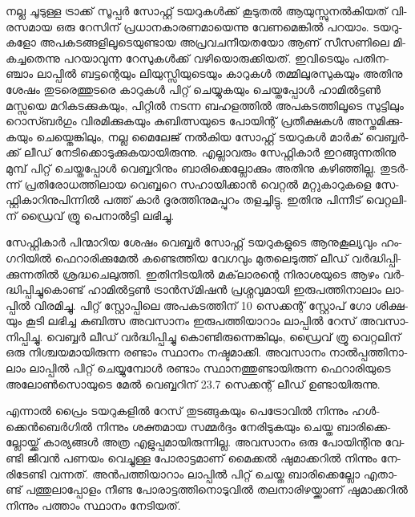 ­ന­ല്ല ചൂ­ടു­ള്ള ട്രാ­ക്ക് സൂ­പ്പര്‍ സോ­ഫ്റ്റ് ടയ­റു­കള്‍­ക്ക് കൂ­ടു­തല്‍ ആയു­സ്സു­നല്‍­കി­യ­ത് വി­ര­സ­മായ ഒരു റേ­സി­ന് 
പ്ര­ധാ­ന­കാ­ര­ണ­മാ­യെ­ന്നു വേ­ണ­മെ­ങ്കില്‍ പറ­യാം. ടയ­റു­ക­ളോ അപ­ക­ട­ങ്ങ­ളി­ലൂ­ടെ­യു­ണ്ടായ അപ്ര­വ­ച­നീ­യ­ത­യോ ആണ് 
സീ­സ­ണി­ലെ മി­ക­ച്ച­തെ­ന്നു പറ­യാ­വു­ന്ന റേ­സു­കള്‍­ക്ക് വഴി­യൊ­രു­ക്കി­യ­ത്. ഇവി­ടെ­യും പതി­ന­ഞ്ചാം ലാ­പ്പില്‍ ബട്ട­ന്റെ­യും 
ലി­യു­സ്സി­യു­ടെ­യും കാ­റു­കള്‍ തമ്മി­ലു­ര­സു­ക­യും അതി­നു ശേ­ഷം തു­ട­രെ­ത്തു­ട­രെ കാ­റു­കള്‍ പി­റ്റ് ചെ­യ്യു­ക­യും ചെ­യ്ത­പ്പോള്‍ 
ഹാ­മില്‍­ട്ടണ്‍ മസ്സ­യെ മറി­ക­ട­ക്കു­ക­യും, പി­റ്റില്‍ നട­ന്ന ബഹ­ള­ത്തില്‍ അപ­ക­ട­ത്തി­ലൂ­ടെ സു­ട്ടി­ലും റൊ­സ്ബര്‍­ഗും 
വി­ര­മി­ക്കു­ക­യും കു­ബി­ത്സ­യു­ടെ പോ­യി­ന്റ് പ്ര­തീ­ക്ഷ­കള്‍ അസ്ത­മി­ക്കു­ക­യും ചെ­യ്തെ­ങ്കി­ലും, നല്ല മൈ­ലേ­ജ് നല്‍­കിയ സോ­ഫ്റ്റ് 
ടയ­റു­കള്‍ മാര്‍­ക് വെ­ബ്ബര്‍­ക്ക് ലീ­ഡ് നേ­ടി­ക്കൊ­ടു­ക്കു­ക­യാ­യി­രു­ന്നു. എല്ലാ­വ­രും സേ­ഫ്റ്റി­കാര്‍ ഇറ­ങ്ങു­ന്ന­തി­നു മു­മ്പ് പി­റ്റ് 
ചെ­യ്ത­പ്പോള്‍ വെ­ബ്ബ­റി­നും ബാ­രി­ക്കെ­ല്ലോ­ക്കും അതി­നു കഴി­ഞ്ഞി­ല്ല. തു­ടര്‍­ന്ന് പ്ര­തി­രോ­ധ­ത്തി­ലായ വെ­ബ്ബ­റെ സഹാ­യി­ക്കാന്‍ 
വെ­റ്റല്‍ മറ്റു­കാ­റു­ക­ളെ സേ­ഫ്റ്റി­കാ­റി­നു­പി­ന്നില്‍ പത്ത് കാര്‍ ദൂ­ര­ത്തി­നു­മ­പ്പു­റം തള­ച്ചി­ട്ടു. ഇതി­നു പി­ന്നീ­ട് വെ­റ്റ­ലി­ന് ഡ്രൈ­വ് 
ത്രൂ പെ­നാല്‍­ട്ടി ലഭി­ച്ചു­.

­സേ­ഫ്റ്റി­കാര്‍ പി­ന്മാ­റിയ ശേ­ഷം വെ­ബ്ബര്‍ സോ­ഫ്റ്റ് ടയ­റു­ക­ളു­ടെ ആനു­കൂ­ല്യ­വും ഹം­ഗ­റി­യില്‍ ഫെ­റാ­രി­ക്കു­മേല്‍ കണ്ടെ­ത്തിയ 
വേ­ഗ­വും മു­ത­ലെ­ടു­ത്ത് ലീ­ഡ് വര്‍­ദ്ധി­പ്പി­ക്കു­ന്ന­തില്‍ ശ്ര­ദ്ധ­ചെ­ലു­ത്തി. ഇതി­നി­ട­യില്‍ മക്‌­ലാ­ര­ന്റെ നി­രാ­ശ­യു­ടെ ആഴം 
വര്‍­ദ്ധി­പ്പി­ച്ചു­കൊ­ണ്ട് ഹാ­മില്‍­ട്ടണ്‍ ട്രാന്‍­സ്‌­മി­ഷന്‍ പ്ര­ശ്ന­വു­മാ­യി ഇരു­പ­ത്തി­നാ­ലാം ലാ­പ്പില്‍ വി­ര­മി­ച്ചു. പി­റ്റ് സ്റ്റോ­പ്പി­ലെ 
അപ­ക­ട­ത്തി­ന് 10 സെ­ക്ക­ന്റ് സ്റ്റോ­പ് ഗോ ശി­ക്ഷ­യും കൂ­ടി ലഭി­ച്ച കു­ബി­ത്സ അവ­സാ­നം ഇരു­പ­ത്തി­യാ­റാം ലാ­പ്പില്‍ 
റേ­സ് അവ­സാ­നി­പ്പി­ച്ചു. വെ­ബ്ബര്‍ ലീ­ഡ് വര്‍­ദ്ധി­പ്പി­ച്ചു കൊ­ണ്ടി­രു­ന്നെ­ങ്കി­ലും, ഡ്രൈ­വ് ത്രൂ വെ­റ്റ­ലി­ന് ഒരു 
നി­ശ്ച­യ­മാ­യി­രു­ന്ന രണ്ടാം സ്ഥാ­നം നഷ്ട­മാ­ക്കി. അവ­സാ­നം നാല്‍­പ്പ­ത്തി­നാ­ലാം ലാ­പ്പില്‍ പി­റ്റ് ചെ­യ്യു­മ്പോള്‍ രണ്ടാം 
സ്ഥാ­ന­ത്തു­ണ്ടാ­യി­രു­ന്ന ഫെ­റാ­രി­യു­ടെ അലോണ്‍­സൊ­യു­ടെ മേല്‍ വെ­ബ്ബ­റി­ന് 23.7 സെ­ക്ക­ന്റ് ലീ­ഡ് ഉണ്ടാ­യി­രു­ന്നു­.

എ­ന്നാല്‍ പ്രൈം ടയ­റു­ക­ളില്‍ റേ­സ് തു­ട­ങ്ങു­ക­യും പെ­ട്രോ­വില്‍ നി­ന്നും ഹള്‍­ക്കെന്‍­ബെര്‍­ഗില്‍ നി­ന്നും ശക്ത­മായ സമ്മര്‍­ദ്ദം 
നേ­രി­ടു­ക­യും ചെ­യ്ത ബാ­രി­ക്കെ­ല്ലോ­യ്ക്ക് കാ­ര്യ­ങ്ങള്‍ അത്ര എളു­പ്പ­മാ­യി­രു­ന്നി­ല്ല. അവ­സാ­നം ഒരു പോ­യി­ന്റി­നു വേ­ണ്ടി ജീ­വന്‍ 
പണ­യം വെ­ച്ചു­ള്ള പോ­രാ­ട്ട­മാ­ണ് മൈ­ക്കല്‍ ഷു­മാ­ക്ക­റില്‍ നി­ന്നും നേ­രി­ടേ­ണ്ടി വന്ന­ത്. അന്‍­പ­ത്തി­യാ­റാം ലാ­പ്പില്‍ പി­റ്റ് 
ചെ­യ്ത ­ബാ­രി­ക്കെ­ല്ലോ­ എതാ­ണ്ട് പത്തു­ലാ­പ്പോ­ളം നീ­ണ്ട പോ­രാ­ട്ട­ത്തി­നൊ­ടു­വില്‍ തല­നാ­രി­ഴ­യ്ക്കാ­ണ് ഷു­മാ­ക്ക­റില്‍ നി­ന്നും 
പത്താം സ്ഥാ­നം നേ­ടി­യ­ത്.

